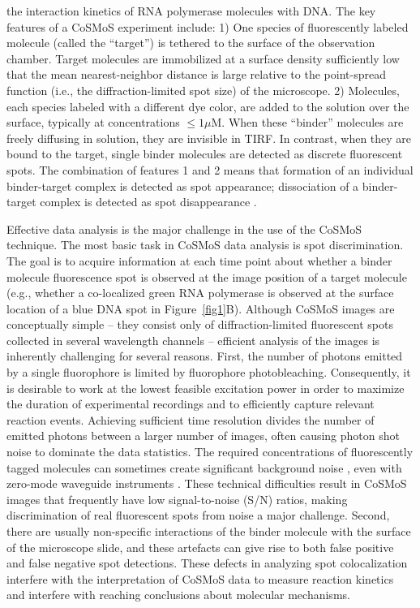 the interaction kinetics of RNA polymerase molecules with DNA. The key features of a CoSMoS experiment include: 1) One species of fluorescently labeled molecule (called the “target”) is tethered to the surface of the observation chamber. Target molecules are immobilized at a surface density sufficiently low that the mean nearest-neighbor distance is large relative to the point-spread function (i.e., the diffraction-limited spot size) of the microscope. 2) Molecules, each species labeled with a different dye color, are added to the solution over the surface, typically at concentrations $\leq 1 \mu$M. When these “binder” molecules are freely diffusing in solution, they are invisible in TIRF. In contrast, when they are bound to the target, single binder molecules are detected as discrete fluorescent spots. The combination of features 1 and 2 means that formation of an individual binder-target complex is detected as spot appearance; dissociation of a binder-target complex is detected as spot disappearance \cite{Friedman2006-kb, Friedman2015-nx}.

Effective data analysis is the major challenge in the use of the CoSMoS technique. The most basic task in CoSMoS data analysis is spot discrimination. The goal is to acquire information at each time point about whether a binder molecule fluorescence spot is observed at the image position of a target molecule (e.g., whether a co-localized green RNA polymerase is observed at the surface location of a blue DNA spot in Figure~\ref{fig1}B). Although CoSMoS images are conceptually simple -- they consist only of diffraction-limited fluorescent spots collected in several wavelength channels -- efficient analysis of the images is inherently challenging for several reasons. First, the number of photons emitted by a single fluorophore is limited by fluorophore photobleaching. Consequently, it is desirable to work at the lowest feasible excitation power in order to maximize the duration of experimental recordings and to efficiently capture relevant reaction events. Achieving sufficient time resolution divides the number of emitted photons between a larger number of images, often causing photon shot noise to dominate the data statistics. The required concentrations of fluorescently tagged molecules can sometimes create significant background noise \cite{Peng2018-ge, Van_Oijen2011-ig}, even with zero-mode waveguide instruments \cite{Chen2014-jd}. These technical difficulties result in CoSMoS images that frequently have low signal-to-noise (S/N) ratios, making discrimination of real fluorescent spots from noise a major challenge. Second, there are usually non-specific interactions of the binder molecule with the surface of the microscope slide, and these  artefacts can give rise to both false positive and false negative spot detections. These defects in analyzing spot colocalization interfere with the interpretation of CoSMoS data to measure reaction kinetics and interfere with reaching conclusions about molecular mechanisms.

